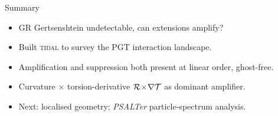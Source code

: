 \begin{frame}{Summary}
  \begin{itemize}\itemsep0.8em
    \item GR Gertsenshtein undetectable, can extensions amplify?
    \item Built \textsc{tidal} to survey the PGT interaction landscape.
    \item Amplification and suppression both present at linear order, ghost-free. 
    \item Curvature $\times$ torsion-derivative $\mathcal{R}\!\times\! \nabla\mathcal{T}$ as dominant amplifier.
    \item Next: localised geometry; \textit{PSALTer} particle-spectrum analysis.
  \end{itemize}
\end{frame}
